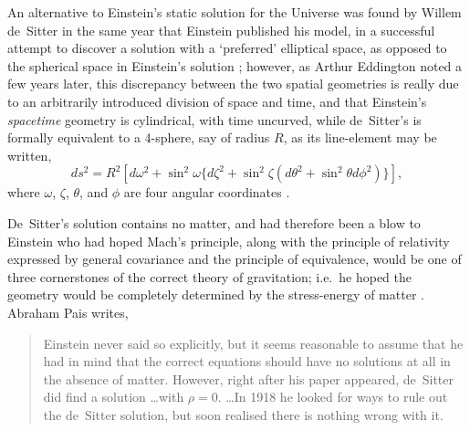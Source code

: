 An alternative to Einstein's static solution for the Universe was found by Willem de~Sitter in the same year that Einstein published his model, in a successful attempt to discover a solution with a `preferred' elliptical space, as opposed to the spherical space in Einstein's solution \cite{deSitter1917}; however, as Arthur Eddington noted a few years later, this discrepancy between the two spatial geometries is really due to an arbitrarily introduced division of space and time, and that Einstein's \textit{spacetime} geometry is cylindrical, with time uncurved, while de~Sitter's is formally equivalent to a 4-sphere, say of radius $R$, as its line-element may be written,
\begin{equation} 
ds^2=R^2[d\omega^2+\sin^2\omega\{d\zeta^2+\sin^2\zeta(d\theta^2+\sin^2\theta{d\phi^2})\}],\label{deSitter_sphere}
\end{equation}
where $\omega$, $\zeta$, $\theta$, and $\phi$ are four angular coordinates \cite{Eddington1923}. 

De~Sitter's solution contains no matter, and had therefore been a blow to Einstein who had hoped Mach's principle, along with the principle of relativity expressed by general covariance and the principle of equivalence, would be one of three cornerstones of the correct theory of gravitation; i.e.~he hoped the geometry would be completely determined by the stress-energy of matter \cite{Pais1982}. Abraham Pais \cite{Pais1982} writes, 
\begin{quotation}
Einstein never said so explicitly, but it seems reasonable to assume that he had in mind that the correct equations should have no solutions at all in the absence of matter. However, right after his paper appeared, de~Sitter did find a solution \ldots with $\rho=0$. \ldots In 1918 he looked for ways to rule out the de~Sitter solution, but soon realised there is nothing wrong with it.
\end{quotation}

